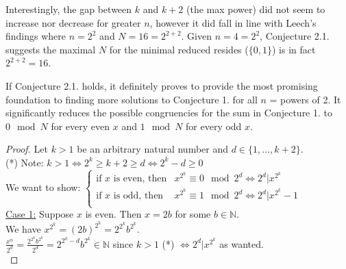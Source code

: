 \documentclass{article}
\begin{document}
\begin{flushleft}
    \vspace{.1in}
    
    Interestingly, the gap between $k$ and $k+2$ (the max power) did not seem to increase nor decrease for greater $n$, however it did fall in line with Leech's \cite{leech} findings where $n=2^2$ and $N=16=2^{2+2}$. Given $n=4=2^2$, Conjecture 2.1. suggests the maximal $N$ for the minimal reduced resides ($\{0,1\}$) is in fact $2^{2+2}=16$.

    \vspace{.1in}

    If Conjecture 2.1. holds, it definitely proves to provide the most promising foundation to finding more solutions to Conjecture 1. for all $n$ = powers of 2. It significantly reduces the possible congruencies for the sum in Conjecture 1. to $0\mod N$ for every even $x$ and $1\mod N$ for every odd $x$.

    \vspace{.1in}

    \begin{proof}
        Let $k>1$ be an arbitrary natural number and $d\in\{1,...,k+2\}$.\\\vspace{.05in}
        (*) Note: $k>1 \Longleftrightarrow 2^k\ge k+2\ge d\Longleftrightarrow 2^k-d\ge 0$\\
        \vspace{.1in}
        We want to show:
        $\begin{cases}
            \text{if $x$ is even, then} & x^{2^k}\equiv 0\mod 2^d \Longleftrightarrow 2^d|x^{2^k}\\
            \text{if $x$ is odd, then} & x^{2^k}\equiv 1\mod 2^d \Longleftrightarrow 2^d|x^{2^k}-1\\
        \end{cases}$\\
        \vspace{.1in}
        \underline{Case 1:} Suppose $x$ is even. Then $x=2b$ for some $b\in{\mathbb{N}}$.\\\vspace{.05in}
        We have $x^{2^k}=(2b)^{2^k}=2^{2^k}b^{2^k}$.\\\vspace{.05in}
        \hspace{.2in} $\displaystyle\frac{x^n}{2^d}=\frac{2^{2^k}b^{2^k}}{2^d}=2^{2^k-d}b^{2^k}\in\mathbb{N}$ since $k>1$ (*) $\Longleftrightarrow 2^d|x^{2^k}$ as wanted.\\


\end{proof}
\end{flushleft}
\end{document}

